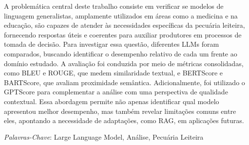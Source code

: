 A problemática central deste trabalho consiste em verificar se modelos de linguagem generalistas, amplamente utilizados em áreas como a medicina e na educação, são capazes de atender às necessidades específicas da pecuária leiteira, fornecendo respostas úteis e coerentes para auxiliar produtores em processos de tomada de decisão. Para investigar essa questão, diferentes LLMs foram comparados, buscando identificar o desempenho relativo de cada um frente ao domínio estudado.
A avaliação foi conduzida por meio de métricas consolidadas, como BLEU e ROUGE, que medem similaridade textual, e BERTScore e BARTScore, que avaliam proximidade semântica. Adicionalmente, foi utilizado o GPTScore para complementar a análise com uma perspectiva de qualidade contextual. Essa abordagem permite não apenas identificar qual modelo apresentou melhor desempenho, mas também revelar limitações comuns entre eles, apontando a necessidade de adaptações, como RAG, em aplicações futuras.   

\textit{Palavras-Chave}: Large Language Model, Análise, Pecuária Leiteira